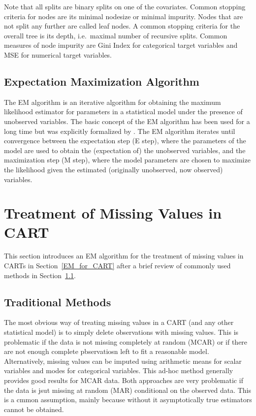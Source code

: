 \documentclass[12pt, twoside]{article}
\newcommand{\1}{\mathbb{1}}
\begin{document}
Note that all splits are binary splits on one of the covariates. Common stopping criteria for nodes are its minimal nodesize or minimal impurity. Nodes that are not split any further are called leaf nodes.
A common stopping criteria for the overall tree is its depth, i.e.\ maximal number of recursive splits. 
Common measures of node impurity are Gini Index for categorical target variables and MSE for numerical target variables.


\subsection{Expectation Maximization Algorithm}\label{EM_algorithm}
The EM algorithm is an iterative algorithm for obtaining the maximum likelihood estimator for parameters in a statistical model under the presence of unobserved variables. 
The basic concept of the EM algorithm has been used for a long time but was explicitly formalized by \cite{dempster1977maximum}.
The EM algorithm iterates until convergence between the expectation step (E step), where the parameters of the model are used to obtain the (expectation of) the unobserved variables, and the maximization step (M step), where the model parameters are chosen to maximize the likelihood given the estimated (originally unobserved, now observed) variables.

\section{Treatment of Missing Values in CART}\label{treatment_of_missing_values_in_cart}
This section introduces an EM algorithm for the treatment of missing values in CARTs in Section~\ref{EM_for_CART} after a brief review of commonly used methods in Section~\ref{traditional_methods}.

\subsection{Traditional Methods}\label{traditional_methods}
The most obvious way of treating missing values in a CART (and any other statistical model) is to simply delete observations with missing values. This is problematic if the data is not missing completely at random (MCAR) or if there are not enough complete pbservatiosn left to fit a reasonable model. 
Alternatively, missing values can be imputed using arithmetic means for scalar variables and modes for categorical variables. This ad-hoc method generally provides good results for MCAR data.
Both approaches are very problematic if the data is jsut missing at random (MAR) conditional on the observed data. This is a cmmon assumption, mainly because without it asymptotically true estimators cannot be obtained.
\end{document}
